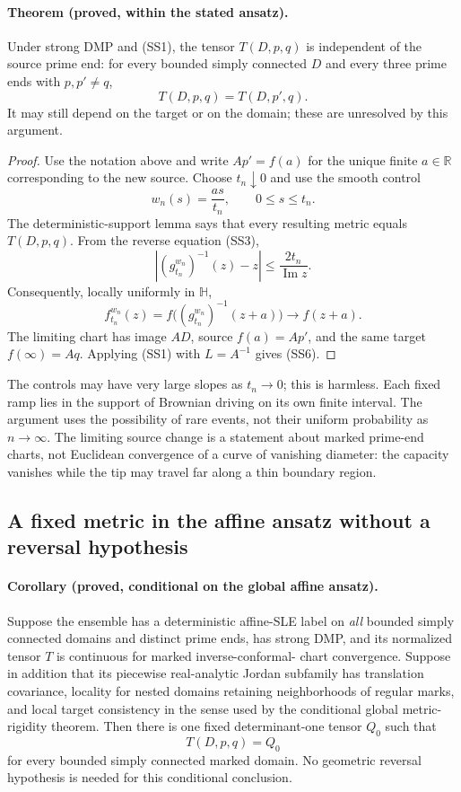 \documentclass[11pt]{article}
\theoremstyle{definition}\newtheorem{definition}[theorem]{Definition}
\theoremstyle{remark}\newtheorem{remark}[theorem]{Remark}
\begin{document}
\paragraph{Theorem (proved, within the stated ansatz).}
Under strong DMP and (SS1), the tensor $T(D,p,q)$ is independent of the
source prime end: for every bounded simply connected $D$ and every three
prime ends with $p,p'\ne q$,
\[
 T(D,p,q)=T(D,p',q).
 \tag{SS6}
\]
It may still depend on the target or on the domain; these are unresolved
by this argument.

\begin{proof}
Use the notation above and write $Ap'=f(a)$ for the unique finite
$a\in\mathbb R$ corresponding to the new source.  Choose $t_n\downarrow0$
and use the smooth control
\[
 w_n(s)=\frac{as}{t_n},\qquad 0\leq s\leq t_n.
\]
The deterministic-support lemma says that every resulting metric equals
$T(D,p,q)$.  From the reverse equation (SS3),
\[
 |(g_{t_n}^{w_n})^{-1}(z)-z|
 \leq\frac{2t_n}{\operatorname{Im}z}.
 \tag{SS7}
\]
Consequently, locally uniformly in $\mathbb H$,
\[
 f_{t_n}^{w_n}(z)
   = f\bigl((g_{t_n}^{w_n})^{-1}(z+a)\bigr)
   \longrightarrow f(z+a).
\]
The limiting chart has image $AD$, source $f(a)=Ap'$, and the same target
$f(\infty)=Aq$.  Applying (SS1) with $L=A^{-1}$ gives (SS6).
\end{proof}

The controls may have very large slopes as $t_n\to0$; this is harmless.
Each fixed ramp lies in the support of Brownian driving on its own finite
interval.  The argument uses the possibility of rare events, not their
uniform probability as $n\to\infty$.  The limiting source change is a
statement about marked prime-end charts, not Euclidean convergence of a
curve of vanishing diameter: the capacity vanishes while the tip may
travel far along a thin boundary region.

\subsection{A fixed metric in the affine ansatz without a reversal hypothesis}

\paragraph{Corollary (proved, conditional on the global affine ansatz).}
Suppose the ensemble has a deterministic affine-SLE label on \emph{all}
bounded simply connected domains and distinct prime ends, has strong DMP,
and its normalized tensor $T$ is continuous for marked inverse-conformal-
chart convergence.  Suppose in addition that its piecewise real-analytic
Jordan subfamily has translation covariance, locality for nested domains
retaining neighborhoods of regular marks, and local target consistency in
the sense used by the conditional global metric-rigidity theorem.  Then
there is one fixed determinant-one tensor $Q_0$ such that
\[
 T(D,p,q)=Q_0
\]
for every bounded simply connected marked domain.  No geometric reversal
hypothesis is needed for this conditional conclusion.
\end{document}

